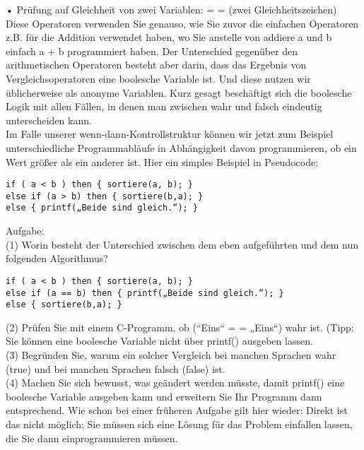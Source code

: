 •	Prüfung auf Gleichheit von zwei Variablen: = = (zwei Gleichheitszeichen)\\

Diese Operatoren verwenden Sie genauso, wie Sie zuvor die einfachen Operatoren z.B. für die Addition verwendet haben, wo Sie anstelle von addiere a und b einfach a + b programmiert haben. Der Unterschied gegenüber den arithmetischen Operatoren besteht aber darin, dass das Ergebnis von Vergleichsoperatoren eine boolesche Variable ist. Und diese nutzen wir üblicherweise als anonyme Variablen. Kurz gesagt beschäftigt sich die boolesche Logik mit allen Fällen, in denen man zwischen wahr und falsch eindeutig unterscheiden kann.\\

Im Falle unserer wenn-dann-Kontrollstruktur können wir jetzt zum Beispiel unterschiedliche Programmabläufe in Abhängigkeit davon programmieren, ob ein Wert größer als ein anderer ist. Hier ein simples Beispiel in Pseudocode:\\

\begin{verbatim}
if ( a < b ) then { sortiere(a, b); }
else if (a > b) then { sortiere(b,a); }
else { printf(„Beide sind gleich.“); }
\end{verbatim}

Aufgabe:\\

(1)	Worin besteht der Unterschied zwischen dem eben aufgeführten und dem nun folgenden Algorithmus?

\begin{verbatim}
if ( a < b ) then { sortiere(a, b); }
else if (a == b) then { printf(„Beide sind gleich.“); }
else { sortiere(b,a); }
\end{verbatim}

(2)	Prüfen Sie mit einem C-Programm, ob (``Eins“ = = „Eins“) wahr ist. (Tipp: Sie können eine boolesche Variable nicht über printf() ausgeben lassen.\\

(3)	Begründen Sie, warum ein solcher Vergleich bei manchen Sprachen wahr (true) und bei manchen Sprachen falsch (false) ist.\\

(4)	Machen Sie sich bewusst, was geändert werden müsste, damit printf() eine boolesche Variable ausgeben kann und erweitern Sie Ihr Programm dann entsprechend. Wie schon bei einer früheren Aufgabe gilt hier wieder: Direkt ist das nicht möglich; Sie müssen sich eine Lösung für das Problem einfallen lassen, die Sie dann einprogrammieren müssen.\\

